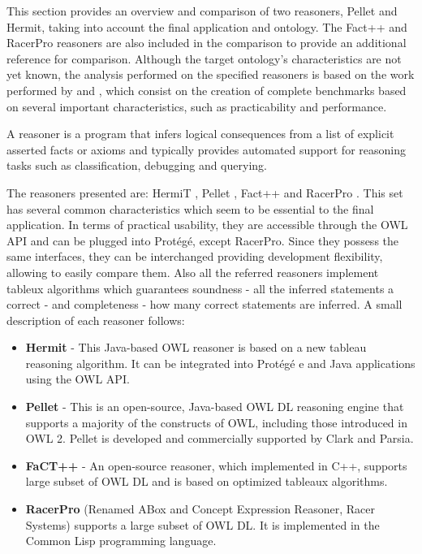 
This section provides an overview and comparison of two reasoners, Pellet and Hermit, taking into account the final application and ontology. The Fact++ and RacerPro reasoners are also included in the comparison to provide an additional reference for comparison.
Although the target ontology's characteristics are not yet known, the analysis performed on the specified reasoners is based on the work performed by \cite{Dentler2011} and \cite{Bock2008}, which consist on the creation of complete benchmarks based on several important characteristics, such as practicability and performance.

A reasoner is a program that infers logical consequences from a list of explicit asserted facts or axioms and typically provides automated support for reasoning tasks such as classification, debugging and querying.

The reasoners presented are: HermiT \cite{1_hermitreasoner}, Pellet \cite{2_stardog-union/pellet_2016}, Fact++ \cite{3_fact++reasoner} and RacerPro \cite{4_racerpro_2016}. This set has several common characteristics which seem to be essential to the final application. In terms of practical usability, they are accessible through the OWL API and can be plugged into Protégé, except RacerPro. Since they possess the same interfaces, they can be interchanged providing development flexibility, allowing to easily compare them. Also all the referred reasoners implement tableux algorithms which guarantees soundness - all the inferred statements a correct - and completeness - how many correct statements are inferred. A small description of each reasoner follows:

\begin{itemize}
\item \textbf{Hermit} - This Java-based OWL reasoner is based on a new tableau reasoning algorithm. It can be integrated into Protégé e and Java applications using the OWL API.
\item \textbf{Pellet} - This is an open-source, Java-based OWL DL reasoning engine that supports a majority of the constructs of OWL, including those introduced in OWL 2. Pellet is developed and commercially supported by Clark and Parsia.
\item \textbf{FaCT++} - An open-source reasoner, which implemented in C++, supports large subset of OWL DL and is based on optimized tableaux algorithms.
\item \textbf{RacerPro} (Renamed ABox and Concept Expression
Reasoner, Racer Systems) supports a large subset of OWL DL. It is implemented in the Common Lisp programming language.
\end{itemize}

